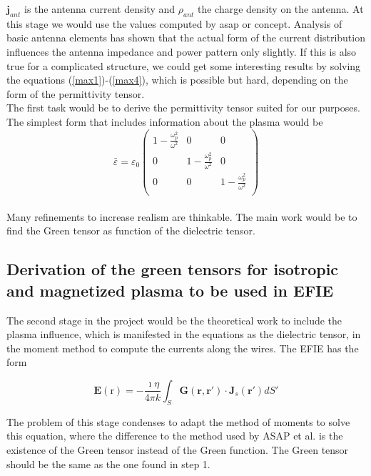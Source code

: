 \documentclass[a4paper,10pt]{article}
\begin{document}
$ \mathbf{j}_{ant}$ is the antenna current density and $\rho_{ant}$ the charge density on the antenna. At this stage we would use the values computed by asap or concept. Analysis of basic antenna elements has shown that the actual form of the current distribution influences the antenna impedance and power pattern only slightly. If this is also true for a complicated structure, we could get some interesting results by solving the equations (\ref{max1})-(\ref{max4}), which is possible but hard, depending on the form of the permittivity tensor.\\

The first task would be to derive the permittivity tensor suited for our purposes. The simplest form that includes information about the plasma would be\\

\begin{equation}\label{isotropic_tensor}
 \bar{\varepsilon}=\varepsilon_0
 \left(
 \begin{array}{ccc}
 1-\frac{\omega_p^2}{\omega^2} & 0 & 0 \\
 0 & 1-\frac{\omega_p^2}{\omega^2} & 0 \\
 0 & 0 & 1-\frac{\omega_p^2}{\omega^2}
 \\\end{array}
  \right)
  \end{equation}\\

Many refinements to increase realism are thinkable. The main work would be to find the Green tensor as function of the dielectric tensor.

\subsection{Derivation of the green tensors for isotropic and magnetized plasma to be used in EFIE}
The second stage in the project would be the theoretical work to include the plasma influence, which is manifested in the equations as the dielectric tensor, in the moment method to compute the currents along the wires. The EFIE has the form

\begin{equation}\label{EFIE}
    \mathbf{E}(\mathrm{r}) = -\frac{\imath \eta}{4 \pi k} \int_S \mathbf{G(\mathbf{r},\mathbf{r}')} \cdot \mathbf{J}_s (\mathbf{r}') dS'
\end{equation}

The problem of this stage condenses to adapt the method of moments to solve this equation, where the difference to the method used by ASAP et al. is the existence of the Green tensor instead of the Green function. The Green tensor should be the same as the one found in step 1.
\end{document}
